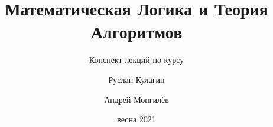 \documentclass[
	fontsize=10pt, %
	twoside=false, %
	numbers=noenddot, %
]{kaobook}
\begin{document}


\title{Математическая Логика и Теория Алгоритмов}
\subtitle{Конспект лекций по курсу}

\author[Ruslan Kulagin]{Руслан Кулагин}
\author[Andrey Mongilyov]{Андрей Монгилёв}

\date{весна 2021}



\frontmatter %




\makeatletter
\uppertitleback{\@titlehead} %
\end{document}
